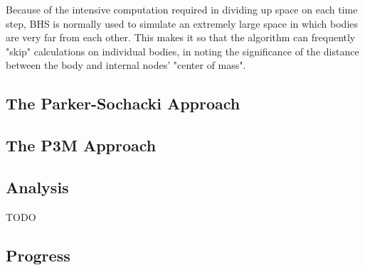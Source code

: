 \documentclass[11pt]{article}
\begin{document}
\newline \newline
Because of the intensive computation required in dividing up space on each time step, BHS is normally used to simulate an extremely large space in which bodies are very far from each other. This makes it so that the algorithm can frequently "skip" calculations on individual bodies, in noting the significance of the distance between the body and internal nodes' "center of mass".
\begin{center}
\section*{The Parker-Sochacki Approach}
\end{center}


\begin{center}
\section*{The P3M Approach}
\end{center}


\begin{center}
\section*{Analysis}
\end{center}
TODO
\begin{center}
\section*{Progress}
\end{center}
\end{document}
